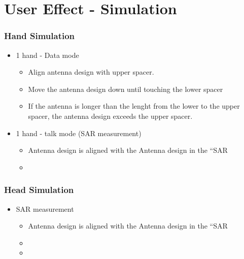 \section{User Effect - Simulation}


\subsubsection{Hand Simulation}
\begin{itemize}
\item 1 hand - Data mode
\begin{itemize}
\item Align antenna design with upper spacer.
\item Move the antenna design down until touching the lower spacer
\item If the antenna is longer than the lenght from the lower to the upper spacer, the antenna design exceeds the upper spacer.
\end{itemize}
\item 1 hand - talk mode (SAR measurement)
\begin{itemize}
\item Antenna design is aligned with the Antenna design in the ``SAR
\item 
\end{itemize}
\end{itemize}

\subsubsection{Head Simulation}
\begin{itemize}
\item SAR measurement
\begin{itemize}
\item Antenna design is aligned with the Antenna design in the ``SAR
\item 
\item 
\end{itemize}
\end{itemize}
